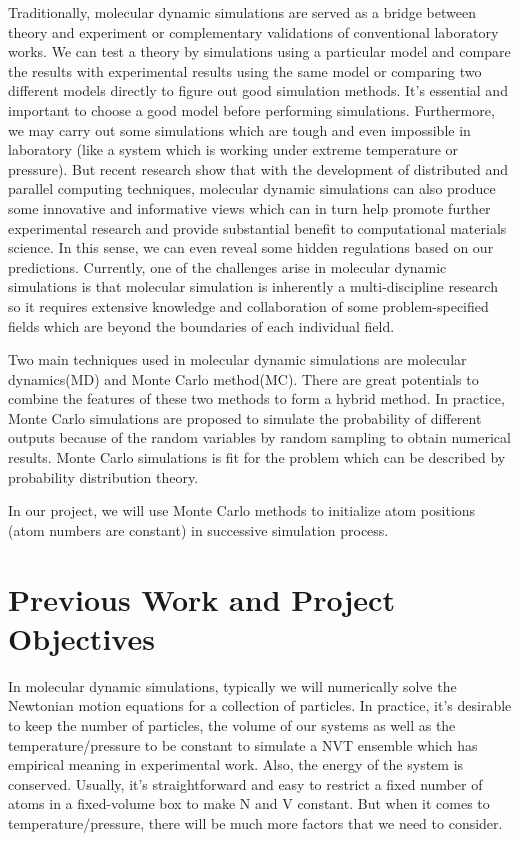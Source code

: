 \documentclass{article}
\begin{document}
\begin{spacing}{1}
Traditionally, molecular dynamic simulations are served as a bridge between theory and experiment or complementary validations of conventional laboratory works. We can test a theory by simulations using a particular model and compare the results with experimental results using the same model or comparing two different models directly to figure out good simulation methods. It’s essential and important to choose a good model before performing simulations. Furthermore, we may carry out some simulations which are tough and even impossible in laboratory (like a system which is working under extreme temperature or pressure). But recent research show that with the development of distributed and parallel computing techniques, molecular dynamic simulations can also produce some innovative and informative views which can in turn help promote further experimental research and provide substantial benefit to computational materials science. In this sense, we can even reveal some hidden regulations based on our predictions. Currently, one of the challenges arise in molecular dynamic simulations is that molecular simulation is inherently a multi-discipline research so it requires extensive knowledge and collaboration of some problem-specified fields which are beyond the boundaries of each individual field.

Two main techniques used in molecular dynamic simulations are molecular dynamics(MD) and Monte Carlo method(MC). There are great potentials to combine the features of these two methods to form a hybrid method. In practice, Monte Carlo simulations are proposed to simulate the probability of different outputs because of the random variables by random sampling to obtain numerical results. Monte Carlo simulations is fit for the problem which can be described by probability distribution theory.

In our project, we will use Monte Carlo methods to initialize atom positions (atom numbers are constant) in successive simulation process. 


\section{Previous Work and Project Objectives}
In molecular dynamic simulations, typically we will numerically solve the Newtonian motion equations for a collection of particles. In practice, it’s desirable to keep the number of particles, the volume of our systems as well as the temperature/pressure to be constant to simulate a NVT ensemble which has empirical meaning in experimental work. Also, the energy of the system is conserved.  Usually, it’s straightforward and easy to restrict a fixed number of atoms in a fixed-volume box to make N and V constant. But when it comes to temperature/pressure, there will be much more factors that we need to consider. 


\end{spacing}
\end{document}
